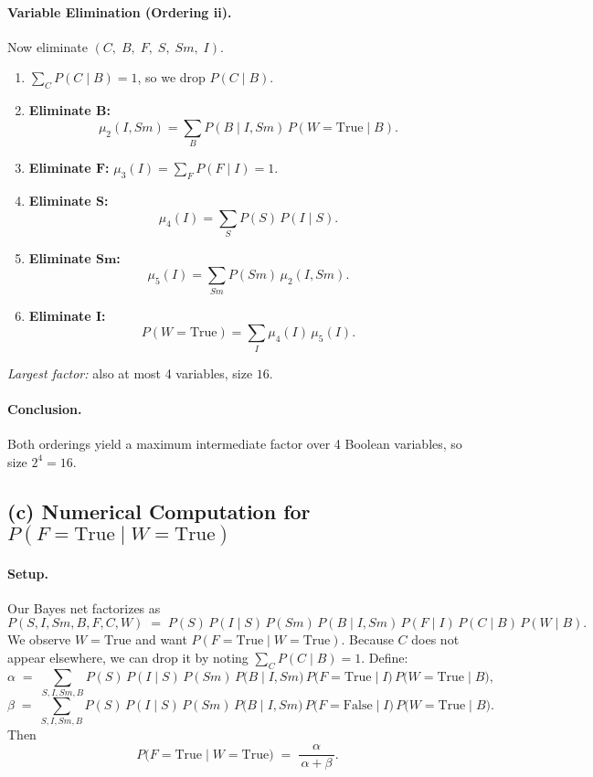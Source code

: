 \documentclass[11pt]{article}
\begin{document}
\paragraph{Variable Elimination (Ordering ii).}
Now eliminate \((C,\;B,\;F,\;S,\;Sm,\;I)\).  
\begin{enumerate}
\item \(\sum_{C}P(C\mid B)=1\), so we drop \(P(C\mid B)\).
\item \textbf{Eliminate \(\boldsymbol{B}\):}
\[
\mu_2(I,Sm)
=\sum_{B}
P(B\mid I,Sm)\,P(W=\text{True}\mid B).
\]
\item \textbf{Eliminate \(\boldsymbol{F}\):}
\(\mu_3(I)=\sum_{F}P(F\mid I)=1.\)
\item \textbf{Eliminate \(\boldsymbol{S}\):}
\[
\mu_4(I)
=\sum_{S}
P(S)\,P(I\mid S).
\]
\item \textbf{Eliminate \(\boldsymbol{Sm}\):}
\[
\mu_5(I)
=\sum_{Sm}
P(Sm)\,\mu_2(I,Sm).
\]
\item \textbf{Eliminate \(\boldsymbol{I}\):}
\[
P(W=\text{True})
=\sum_{I}
\mu_4(I)\,\mu_5(I).
\]
\end{enumerate}
\textit{Largest factor:} also at most 4 variables, size \(16\).

\paragraph{Conclusion.}
Both orderings yield a maximum intermediate factor over 4 Boolean variables, so size \(2^4=16\).

\subsection*{(c) Numerical Computation for \(\displaystyle P(F=\mathrm{True}\mid W=\mathrm{True})\)}

\paragraph{Setup.}
Our Bayes net factorizes as
\[
P(S,I,Sm,B,F,C,W)
\;=\;
P(S)\,P(I\mid S)\,P(Sm)\,P(B\mid I,Sm)\,P(F\mid I)\,P(C\mid B)\,P(W\mid B).
\]
We observe \(W=\mathrm{True}\) and want \(P(F=\mathrm{True}\mid W=\mathrm{True})\).
Because \(C\) does not appear elsewhere, we can drop it by noting \(\sum_C P(C\mid B)=1\).
Define:
\[
\alpha \;=\; \sum_{S,I,Sm,B} P(S)\,P(I\mid S)\,P(Sm)\,P\bigl(B\mid I,Sm\bigr)\,P\bigl(F=\mathrm{True}\mid I\bigr)\,P\bigl(W=\mathrm{True}\mid B\bigr),
\]
\[
\beta \;=\; \sum_{S,I,Sm,B} P(S)\,P(I\mid S)\,P(Sm)\,P\bigl(B\mid I,Sm\bigr)\,P\bigl(F=\mathrm{False}\mid I\bigr)\,P\bigl(W=\mathrm{True}\mid B\bigr).
\]
Then
\[
P\bigl(F=\mathrm{True}\mid W=\mathrm{True}\bigr)
\;=\;
\frac{\alpha}{\,\alpha + \beta\,}.
\]
\end{document}
